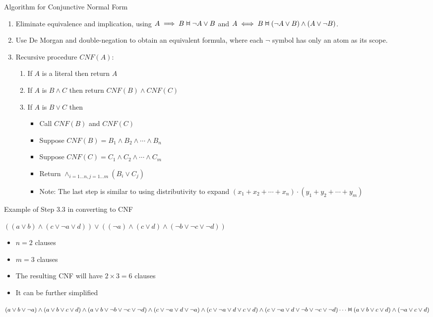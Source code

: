 \documentclass{article}
\newcommand{\vDashv}{%
  \mathrel{%
    \text{%
      \ooalign{$\vDash$\cr\reflectbox{$\vDash$}\cr}%
    }%
  }%
}
\begin{document}
Algorithm for Conjunctive Normal Form

\begin{enumerate}
    \item Eliminate equivalence and implication, using $A \implies B \vDashv \neg A \vee B$ and $A \iff B \vDashv (\neg A \vee B) \wedge (A \vee \neg B)$.
    \item Use De Morgan and double-negation to obtain an equivalent formula, where each $\neg$ symbol has only an atom as its scope. 
    \item Recursive procedure $CNF(A)$:
    \begin{enumerate}
        \item If $A$ is a literal then return $A$
        \item If $A$ is $B \wedge C$ then return $CNF(B) \wedge CNF(C)$ 
        \item If $A$ is $B \vee C$ then
        \begin{itemize}
            \item Call $CNF(B)$ and $CNF(C)$
            \item Suppose $CNF(B) = B_1 \wedge B_2 \wedge \cdots \wedge B_n$
            \item Suppose $CNF(C) = C_1 \wedge C_2 \wedge \cdots \wedge C_m$
            \item Return $\wedge_{i=1\ldots n, j=1 \ldots m} (B_i \vee C_j)$
            \item Note: The last step is similar to using distributivity to expand $(x_1 + x_2 + \cdots + x_n) \cdot (y_1 + y_2 + \cdots + y_m)$
        \end{itemize}
    \end{enumerate}
\end{enumerate}

Example of Step 3.3 in converting to CNF

$((a \vee b) \wedge (c \vee \neg a \vee d)) \vee ((\neg a) \wedge (c \vee d) \wedge (\neg b \vee \neg c \vee \neg d))$

\begin{itemize}
    \item $n=2$ clauses
    \item $m=3$ clauses
    \item The resulting CNF will have $2 \times 3 = 6$ clauses
    \item It can be further simplified
\end{itemize}

$(a \vee b \vee \neg a) \wedge (a \vee b \vee c \vee d) \wedge (a \vee b \vee \neg b \vee \neg c \vee \neg d) \wedge \\(c \vee \neg a \vee d \vee \neg a) \wedge (c \vee \neg a \vee d \vee c \vee d) \wedge \\ (c \vee \neg a \vee d \vee \neg b \vee \neg c \vee \neg d) \cdots \vDashv (a \vee b \vee c \vee d) \wedge (\neg a \vee c \vee d)$
\end{document}
